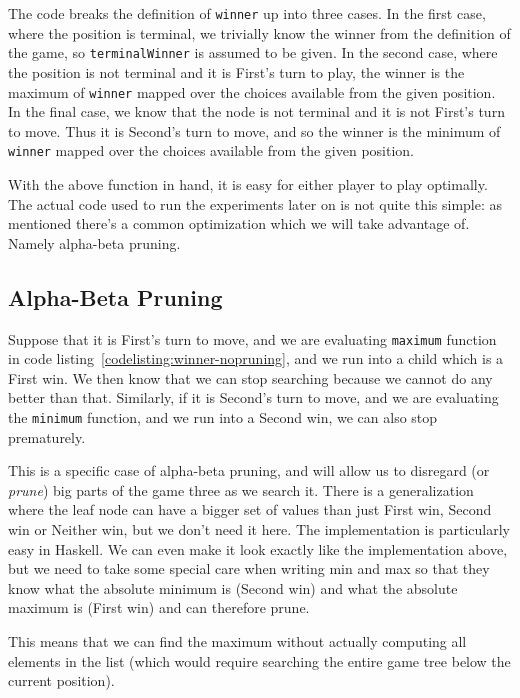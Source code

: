 The code breaks the definition of \texttt{winner} up into three cases.
In the first case, where the position is terminal, we trivially know the winner from the definition of the game, so \texttt{terminalWinner} is assumed to be given.
In the second case, where the position is not terminal and it is First's turn to play, the winner is the maximum of \texttt{winner} mapped over the choices available from the given position.
In the final case, we know that the node is not terminal and it is not First's turn to move. Thus it is Second's turn to move, and so the winner is the minimum of \texttt{winner} mapped over the choices available from the given position.

With the above function in hand, it is easy for either player to play optimally.
The actual code used to run the experiments later on is not quite this simple: as mentioned there's a common optimization which we will take advantage of.
Namely alpha-beta pruning.

\subsection {Alpha-Beta Pruning}
\label{sec:alpha_beta}

Suppose that it is First's turn to move, and we are evaluating \texttt{maximum} function in code listing~\ref{codelisting:winner-nopruning}, and we run into a child which is a First win.
We then know that we can stop searching because we cannot do any better than that.
Similarly, if it is Second's turn to move, and we are evaluating the \texttt{minimum} function, and we run into a Second win, we can also stop prematurely.

This is a specific case of alpha-beta pruning, and will allow us to disregard (or \emph{prune}) big parts of the game three as we search it.
There is a generalization where the leaf node can have a bigger set of values than just First win, Second win or Neither win, but we don't need it here.
The implementation is particularly easy in Haskell. We can even make it look exactly like the implementation above, but we need to take some special care when writing min and max so that they know what the absolute minimum is (Second win) and what the absolute maximum is (First win) and can therefore prune.

This means that we can find the maximum without actually computing all elements in the list (which would require searching the entire game tree below the current position).

